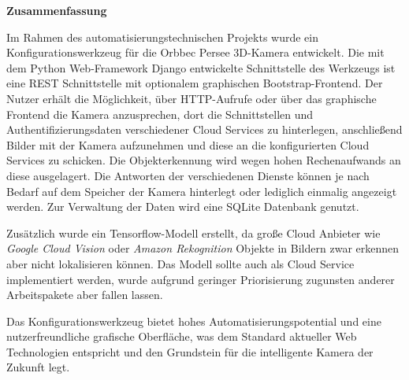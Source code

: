 \thispagestyle{empty}
\vspace*{0.2cm}

\begin{center}
    \textbf{Zusammenfassung}
\end{center}

\vspace*{0.2cm}

Im Rahmen des automatisierungstechnischen Projekts wurde ein Konfigurationswerkzeug für die Orbbec Persee 3D-Kamera entwickelt. Die mit dem Python Web-Framework Django entwickelte Schnittstelle des Werkzeugs ist eine REST Schnittstelle mit optionalem graphischen Bootstrap-Frontend. Der Nutzer erhält die Möglichkeit, über HTTP-Aufrufe oder über das graphische Frontend die Kamera anzusprechen, dort die Schnittstellen und Authentifizierungsdaten verschiedener Cloud Services zu hinterlegen, anschließend Bilder mit der Kamera aufzunehmen und diese an die konfigurierten Cloud Services zu schicken. Die Objekterkennung wird wegen hohen Rechenaufwands an diese ausgelagert. Die Antworten der verschiedenen Dienste können je nach Bedarf auf dem Speicher der Kamera hinterlegt oder lediglich einmalig angezeigt werden. Zur Verwaltung der Daten wird eine SQLite Datenbank genutzt. 

Zusätzlich wurde ein Tensorflow-Modell erstellt, da große Cloud Anbieter wie \emph{Google Cloud Vision} oder \emph{Amazon Rekognition} Objekte in Bildern zwar erkennen aber nicht lokalisieren können. Das Modell sollte auch als Cloud Service implementiert werden, wurde aufgrund geringer Priorisierung zugunsten anderer Arbeitspakete aber fallen lassen.

Das Konfigurationswerkzeug bietet hohes Automatisierungspotential und eine nutzerfreundliche grafische Oberfläche, was dem Standard aktueller Web Technologien entspricht und den Grundstein für die intelligente Kamera der Zukunft legt.